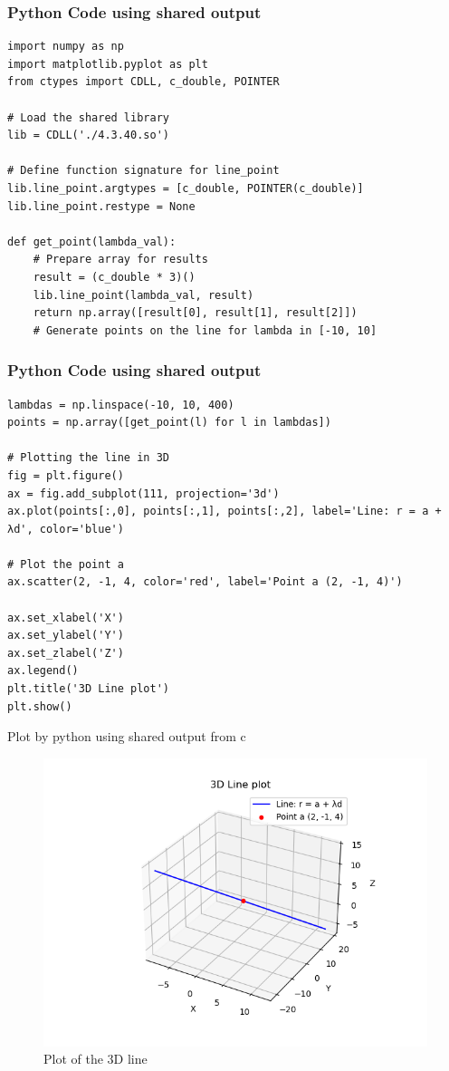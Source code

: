 \documentclass{beamer}
\begin{document}
\begin{frame}[fragile]
	\frametitle{Python Code using shared output}
	\begin{lstlisting}
import numpy as np
import matplotlib.pyplot as plt
from ctypes import CDLL, c_double, POINTER

# Load the shared library
lib = CDLL('./4.3.40.so')

# Define function signature for line_point
lib.line_point.argtypes = [c_double, POINTER(c_double)]
lib.line_point.restype = None

def get_point(lambda_val):
    # Prepare array for results
    result = (c_double * 3)()
    lib.line_point(lambda_val, result)
    return np.array([result[0], result[1], result[2]])
    # Generate points on the line for lambda in [-10, 10]
	\end{lstlisting}
\end{frame}
\begin{frame}[fragile]
	\frametitle{Python Code using shared output}
	\begin{lstlisting}	
lambdas = np.linspace(-10, 10, 400)
points = np.array([get_point(l) for l in lambdas])

# Plotting the line in 3D
fig = plt.figure()
ax = fig.add_subplot(111, projection='3d')
ax.plot(points[:,0], points[:,1], points[:,2], label='Line: r = a + λd', color='blue')

# Plot the point a
ax.scatter(2, -1, 4, color='red', label='Point a (2, -1, 4)')

ax.set_xlabel('X')
ax.set_ylabel('Y')
ax.set_zlabel('Z')
ax.legend()
plt.title('3D Line plot')
plt.show()
	\end{lstlisting}
\end{frame}
\begin{frame}{Plot by python using shared output from c}
	\begin{center}
	\begin{figure}[H]
		\centering
		\includegraphics[width = 0.7\columnwidth]{figs/fig1.png}
		\caption{Plot of the 3D line}
		\label{fig1}
	\end{figure}
	\end{center}
\end{frame}
\end{document}
